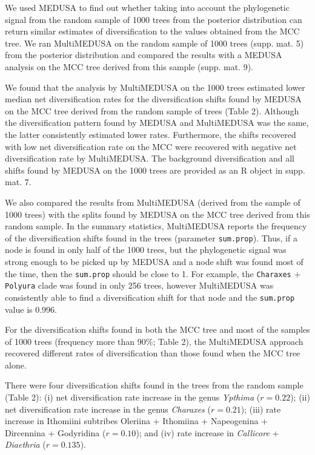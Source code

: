 \documentclass[10pt]{article}
\begin{document}
We used MEDUSA to find out whether taking into account the phylogenetic
signal from the random sample of 1000 trees from the posterior
distribution can return similar estimates of diversification to the
values obtained from the MCC tree. We ran MultiMEDUSA on the random
sample of 1000 trees (supp. mat. 5) from the posterior distribution and
compared the results with a MEDUSA analysis on the MCC tree derived from
this sample (supp. mat. 9).

We found that the analysis by MultiMEDUSA on the 1000 trees estimated
lower median net diversification rates for the diversification shifts
found by MEDUSA on the MCC tree derived from the random sample of trees
(Table 2). Although the diversification pattern found by MEDUSA and
MultiMEDUSA was the same, the latter consistently estimated lower rates.
Furthermore, the shifts recovered with low net diversification rate on
the MCC were recovered with negative net diversification rate by
MultiMEDUSA. The background diversification and all shifts found by
MEDUSA on the 1000 trees are provided as an R object in supp. mat. 7.

We also compared the results from MultiMEDUSA (derived from the sample
of 1000 trees) with the splits found by MEDUSA on the MCC tree derived
from this random sample. In the summary statistics, MultiMEDUSA reports
the frequency of the diversification shifts found in the trees
(parameter \texttt{sum.prop}). Thus, if a node is found in only half of
the 1000 trees, but the phylogenetic signal was strong enough to be
picked up by MEDUSA and a node shift was found most of the time, then
the \texttt{sum.prop} should be close to 1. For example, the
\texttt{Charaxes} + \texttt{Polyura} clade was found in only 256 trees,
however MultiMEDUSA was consistently able to find a diversification
shift for that node and the \texttt{sum.prop} value is 0.996.

For the diversification shifts found in both the MCC tree and most of
the samples of 1000 trees (frequency more than 90\%; Table 2), the
MultiMEDUSA approach recovered different rates of diversification than
those found when the MCC tree alone.

There were four diversification shifts found in the trees from the
random sample (Table 2): (i) net diversification rate increase in the
genus \emph{Ypthima} (\(r = 0.22\)); (ii) net diversification rate
increase in the genus \emph{Charaxes} (\(r = 0.21\)); (iii) rate
increase in Ithomiini subtribes Oleriina + Ithomiina + Napeogenina +
Dircennina + Godyridina (\(r = 0.10\)); and (iv) rate increase in
\emph{Callicore} + \emph{Diaethria} (\(r = 0.135\)).
\end{document}
